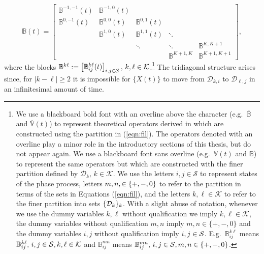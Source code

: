 \[\mathbb B(t) = \left[
	\begin{array}{ccccc}
		\mathbb B^{{-1},{-1}}(t)&\mathbb B^{{-1},0}(t)& & & \\
		\mathbb B^{0,{-1}}(t)&\mathbb B^{0,0}(t)&\mathbb B^{0,1}(t)&& \\
		&\mathbb B^{1,0}(t)&\mathbb B^{1,1}(t)&\ddots& \\
		& & \ddots & \ddots & \mathbb B^{K,{K+1}}\\
		& & & \mathbb B^{{K+1},K} & \mathbb B^{{K+1},{K+1}}
	\end{array}\right],\]
where the blocks \(\mathbb B^{k\ell}:= \begin{bmatrix} \mathbb B_{ij}^{k\ell}(t) \end{bmatrix}_{i,j\in\mathcal S},\,k,\ell\in\mathcal K\).\footnote{We use a blackboard bold font with an overline above the character (e.g.~\(\overline{\mathbb B}\) and \(\overline{\mathbb V}(t)\)) to represent theoretical operators derived in \citep{bo2014} which are constructed using the partition in (\ref{eqn:fil}). The operators denoted with an overline play a minor role in the introductory sections of this thesis, but do not appear again. We use a blackboard font sans overline (e.g.~\(\mathbb V(t)\) and \(\mathbb B\)) to represent the same operators but which are constructed with the finer partition defined by \(\mathcal D_k,\,k\in\mathcal K\). We use the letters \(i,j\in\mathcal S\) to represent states of the phase process, letters \(m,n,\in\mathcal \{+,-,0\}\) to refer to the partition in terms of the sets in Equations (\ref{eqn:fil}), and the letters \(k,\ell\in\mathcal K\) to refer to the finer partition into sets \(\{\mathcal{D}_k\}_k\). With a slight abuse of notation, whenever we use the dummy variables \(k,\ell\) without qualification we imply \(k,\ell\in\mathcal K\), the dummy variables without qualification \(m,n\) imply \(m,n\in\{+,-,0\}\) and the dummy variables \(i,j\) without qualification imply \(i,j\in\mathcal{S}\). E.g.~\(\mathbb B_{ij}^{k\ell}\) means \(\mathbb B_{ij}^{k\ell},\, i,j\in\mathcal{S}, k,\ell\in\mathcal K\) and \(\mathbb B_{ij}^{mn}\) means \(\mathbb B_{ij}^{mn},\, i,j\in\mathcal{S}, m,n\in\{+,-,0\}\).
} The tridiagonal structure arises since, for \(|k-\ell|\geq2\) it is impossible for \(\{X(t)\}\) to move from \(\mathcal D_{k,i}\) to \(\mathcal D_{\ell,j}\) in an infinitesimal amount of time.

